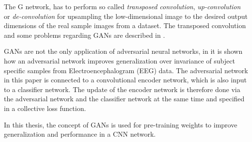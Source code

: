 The G network, has to perform so called \emph{transposed convolution}, \emph{up-convolution} or \emph{de-convolution} for upsampling the low-dimensional image to the desired output dimensions of the real sample images from a dataset.
The transposed convolution and some problems regarding GANs are described in \cite{Durall2020}.

GANs are not the only application of adversarial neural networks, in \cite{Oezdenizci2020} it is shown how an adversarial network improves generalization over invariance of subject specific samples from Electroencephalogram (EEG) data.
The adversarial network in this paper is connected to a convolutional encoder network, which is also input to a classifier network.
The update of the encoder network is therefore done via the adversarial network and the classifier network at the same time and specified in a collective loss function.

In this thesis, the concept of GANs is used for pre-training weights to improve generalization and performance in a CNN network.